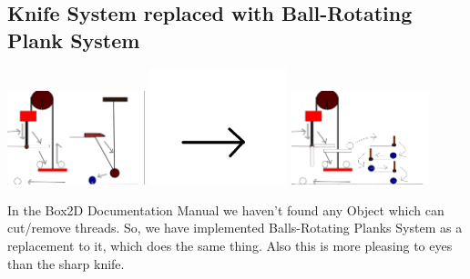\documentclass[11pt]{article}
\begin{document}
\subsection{Knife System replaced with Ball-Rotating Plank System}
\begin{center}
 \includegraphics[width=0.3\textwidth,keepaspectratio]{img/knief.png}
 \includegraphics[width=0.3\textwidth,keepaspectratio]{img/arrow.png}
 \includegraphics[width=0.3\textwidth,keepaspectratio]{img/rot_ball_plank.png}
\end{center}
	In the Box2D Documentation Manual we haven't found any Object which can cut/remove threads.
	So, we have implemented Balls-Rotating Planks System as a replacement to it, which does the same thing.
	Also this is more pleasing to eyes than the sharp knife.
\end{document}

